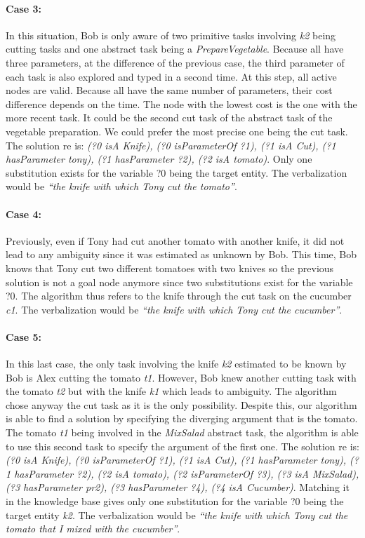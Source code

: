 \paragraph{Case 3:} In this situation, Bob is only aware of two primitive tasks involving \textit{k2} being cutting tasks and one abstract task being a \textit{PrepareVegetable}. Because all have three parameters, at the difference of the previous case, the third parameter of each task is also explored and typed in a second time. At this step, all active nodes are valid. Because all have the same number of parameters, their cost difference depends on the time. The node with the lowest cost is the one with the more recent task. It could be the second cut task of the abstract task of the vegetable preparation. We could prefer the most precise one being the cut task. The solution \acrshort{re} is: \textit{(?0 isA Knife), (?0 isParameterOf ?1), (?1 isA Cut), (?1 hasParameter tony), (?1 hasParameter ?2), (?2 isA tomato)}. Only one substitution exists for the variable ?0 being the target entity. The verbalization would be \textit{``the knife with which Tony cut the tomato''}.

\paragraph{Case 4:} Previously, even if Tony had cut another tomato with another knife, it did not lead to any ambiguity since it was estimated as unknown by Bob. This time, Bob knows that Tony cut two different tomatoes with two knives so the previous solution is not a goal node anymore since two substitutions exist for the variable ?0. The algorithm thus refers to the knife through the cut task on the cucumber \textit{c1}. The verbalization would be \textit{``the knife with which Tony cut the cucumber''}.

\paragraph{Case 5:} In this last case, the only task involving the knife \textit{k2} estimated to be known by Bob is Alex cutting the tomato \textit{t1}. However, Bob knew another cutting task with the tomato \textit{t2} but with the knife \textit{k1} which leads to ambiguity. The algorithm chose anyway the cut task as it is the only possibility. Despite this, our algorithm is able to find a solution by specifying the diverging argument that is the tomato. The tomato \textit{t1} being involved in the \textit{MixSalad} abstract task, the algorithm is able to use this second task to specify the argument of the first one. The solution \acrshort{re} is: \textit{(?0 isA Knife), (?0 isParameterOf ?1), (?1 isA Cut), (?1 hasParameter tony), (?1 hasParameter ?2), (?2 isA tomato), (?2 isParameterOf ?3), (?3 isA MixSalad), (?3 hasParameter pr2), (?3 hasParameter ?4), (?4 isA Cucumber)}. Matching it in the knowledge base gives only one substitution for the variable ?0 being the target entity \textit{k2}. The verbalization would be \textit{``the knife with which Tony cut the tomato that I mixed with the cucumber''}.

